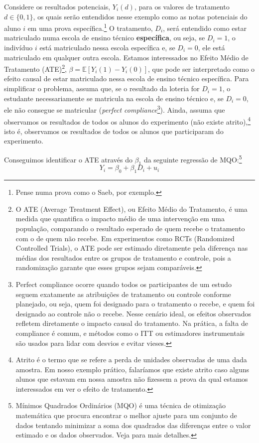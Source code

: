 Considere os resultados potenciais, $Y_i(d)$, para os valores de tratamento $d \in \{0,1\}$, os quais serão entendidos nesse exemplo como as notas potenciais do aluno $i$ em uma prova específica.\footnote{Pense numa prova como o Saeb, por exemplo.} O tratamento, $D_i$, será entendido como estar matriculado numa escola de ensino técnico \textbf{específica}, ou seja, se $D_i = 1$, o indivíduo $i$ está matriculado nessa escola específica e, se $D_i = 0$, ele está matriculado em qualquer outra escola. Estamos interessados no Efeito Médio de Tratamento (ATE)\footnote{O ATE (Average Treatment Effect), ou Efeito Médio do Tratamento, é uma medida que quantifica o impacto médio de uma intervenção em uma população, comparando o resultado esperado de quem recebe o tratamento com o de quem não recebe. Em experimentos como RCTs (Randomized Controlled Trials), o ATE pode ser estimado diretamente pela diferença nas médias dos resultados entre os grupos de tratamento e controle, pois a randomização garante que esses grupos sejam comparáveis.}, $\beta = \mathbb{E}[Y_i(1) - Y_i(0)]$, que pode ser interpretado como o efeito causal de estar matriculado nessa escola de ensino técnico específica. Para simplificar o problema, assuma que, se o resultado da loteria for $D_i = 1$, o estudante necessariamente se matricula na escola de ensino técnico e, se $D_i = 0$, ele não consegue se matricular (\textit{perfect compliance}\footnote{Perfect compliance ocorre quando todos os participantes de um estudo seguem exatamente as atribuições de tratamento ou controle conforme planejado, ou seja, quem foi designado para o tratamento o recebe, e quem foi designado ao controle não o recebe. Nesse cenário ideal, os efeitos observados refletem diretamente o impacto causal do tratamento. Na prática, a falta de compliance é comum, e métodos como o ITT ou estimadores instrumentais são usados para lidar com desvios e evitar vieses.}). Ainda, assuma que observamos os resultados de todos os alunos do experimento (não existe atrito),\footnote{Atrito é o termo que se refere a perda de unidades observadas de uma dada amostra. Em nosso exemplo prático, falaríamos que existe atrito caso alguns alunos que estavam em nossa amostra não fizessem a prova da qual estamos interessados em ver o efeito de tratamento. } isto é, observamos os resultados de todos os alunos que participaram do experimento.

Conseguimos identificar o ATE através do $\beta_1$ da seguinte regressão de MQO:\footnote{Mínimos Quadrados Ordinários (MQO) é uma técnica de otimização matemática que procura encontrar o melhor ajuste para um conjunto de dados tentando minimizar a soma dos quadrados das diferenças entre o valor estimado e os dados observados. Veja \cite{angrist2008} para mais detalhes.}
\begin{equation}
    Y_i = \beta_0 + \beta_1 D_i + u_i
\end{equation}


